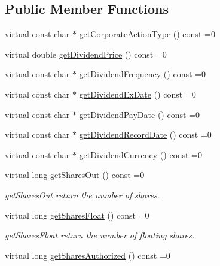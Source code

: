 \subsection*{Public Member Functions}
\begin{CompactItemize}
\item 
virtual const char $\ast$ \hyperlink{classWombat_1_1MamdaFundamentals_c7ce1e97b6aa220000ceda1fb346d033}{get\-Corporate\-Action\-Type} () const =0
\item 
virtual double \hyperlink{classWombat_1_1MamdaFundamentals_7f47ca21e75508a2e09d25686dd98b1a}{get\-Dividend\-Price} () const =0
\item 
virtual const char $\ast$ \hyperlink{classWombat_1_1MamdaFundamentals_f66bec2553735a9615e2c8c9a42946ce}{get\-Dividend\-Frequency} () const =0
\item 
virtual const char $\ast$ \hyperlink{classWombat_1_1MamdaFundamentals_236eb051f36fd73186ed6f19ffd6d4b9}{get\-Dividend\-Ex\-Date} () const =0
\item 
virtual const char $\ast$ \hyperlink{classWombat_1_1MamdaFundamentals_897da92a45e76b87d54f6196a99b2c7e}{get\-Dividend\-Pay\-Date} () const =0
\item 
virtual const char $\ast$ \hyperlink{classWombat_1_1MamdaFundamentals_4606684f0bdf3fa9a9a87e51eb0a7c99}{get\-Dividend\-Record\-Date} () const =0
\item 
virtual const char $\ast$ \hyperlink{classWombat_1_1MamdaFundamentals_fb9076a1d81b7f5c7480950521eff35a}{get\-Dividend\-Currency} () const =0
\item 
virtual long \hyperlink{classWombat_1_1MamdaFundamentals_47890caba7011068a8e2dc9222e883f4}{get\-Shares\-Out} () const =0
\begin{CompactList}\small\item\em get\-Shares\-Out return the number of shares. \item\end{CompactList}\item 
virtual long \hyperlink{classWombat_1_1MamdaFundamentals_64a2fc82594149b801ae5723479df55d}{get\-Shares\-Float} () const =0
\begin{CompactList}\small\item\em get\-Shares\-Float return the number of floating shares. \item\end{CompactList}\item 
virtual long \hyperlink{classWombat_1_1MamdaFundamentals_69967f29f8189a0e9775aa475568a5a7}{get\-Shares\-Authorized} () const =0

\end{CompactItemize}
